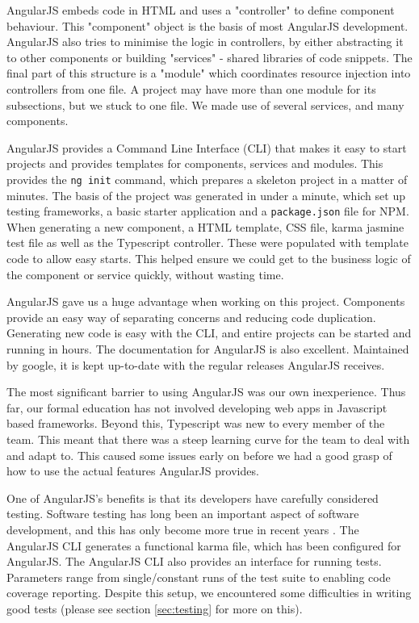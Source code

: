 \documentclass{l3proj}
\begin{document}
AngularJS embeds code in HTML and uses a "controller" to define component behaviour. This
 "component" object is the basis of most AngularJS development. AngularJS also tries
 to minimise the logic in controllers, by either abstracting it to other components
 or building "services" - shared libraries of code snippets. The final part of this
 structure is a "module" which coordinates resource injection into controllers from one
 file. A project may have more than one module for its subsections, but we stuck to
 one file. We made use of several services, and many components.

AngularJS provides a Command Line Interface (CLI) that makes it easy to start projects and provides
 templates for components, services and modules. This provides the \texttt{ng init}
 command, which prepares a skeleton project in a matter of minutes.
 The basis of the project was generated in under a minute, which set up
 testing frameworks, a basic starter application and a \texttt{package.json} file for NPM.
 When generating a new component, a HTML template, CSS file, karma
 jasmine test file as well as the Typescript controller. These were populated
 with template code to allow easy starts. This helped ensure we could get to
 the business logic of the component or service quickly, without wasting time.

  

AngularJS gave us a huge advantage when working on this project. Components provide
 an easy way of separating concerns and reducing code duplication. Generating new
 code is easy with the CLI, and entire projects can be started and running
 in hours. The documentation for AngularJS is also excellent. Maintained by google,
 it is kept up-to-date with the regular releases AngularJS receives.

The most significant barrier to using AngularJS was our own inexperience.
 Thus far, our formal education has not involved developing web apps in
 Javascript based frameworks. Beyond this, Typescript was new to every
 member of the team. This meant that there was a steep learning curve for
 the team to deal with and adapt to. This caused some issues early on
 before we had a good grasp of how to use the actual features AngularJS
 provides.

One of AngularJS's benefits is that its developers have carefully
 considered testing. Software testing has long been an important
 aspect of software development, and this has only become more true
 in recent years \cite{tuteja2012testing}. The AngularJS CLI generates
 a functional karma file, which has been configured for AngularJS. The
 AngularJS CLI also provides an interface for running tests. Parameters
 range from single/constant runs of the test suite to enabling code
 coverage reporting. Despite this setup, we encountered some difficulties in
 writing good tests (please see section \ref{sec:testing} for more on this).
\end{document}
